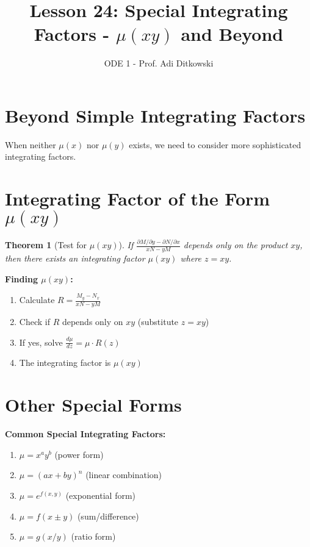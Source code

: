 \documentclass[12pt]{article}
\title{Lesson 24: Special Integrating Factors - $\mu(xy)$ and Beyond}
\author{ODE 1 - Prof. Adi Ditkowski}
\date{}
\newtheorem{theorem}{Theorem}
\begin{document}
\maketitle

\section{Beyond Simple Integrating Factors}

When neither $\mu(x)$ nor $\mu(y)$ exists, we need to consider more sophisticated integrating factors.

\section{Integrating Factor of the Form $\mu(xy)$}

\begin{theorem}[Test for $\mu(xy)$]
If $\frac{\partial M/\partial y - \partial N/\partial x}{xN - yM}$ depends only on the product $xy$, then there exists an integrating factor $\mu(xy)$ where $z = xy$.
\end{theorem}

\begin{algorithm}
\textbf{Finding $\mu(xy)$:}
\begin{enumerate}
    \item Calculate $R = \frac{M_y - N_x}{xN - yM}$
    \item Check if $R$ depends only on $xy$ (substitute $z = xy$)
    \item If yes, solve $\frac{d\mu}{dz} = \mu \cdot R(z)$
    \item The integrating factor is $\mu(xy)$
\end{enumerate}
\end{algorithm}

\section{Other Special Forms}

\begin{keypoint}
\textbf{Common Special Integrating Factors:}
\begin{enumerate}
    \item $\mu = x^a y^b$ (power form)
    \item $\mu = (ax + by)^n$ (linear combination)
    \item $\mu = e^{f(x,y)}$ (exponential form)
    \item $\mu = f(x \pm y)$ (sum/difference)
    \item $\mu = g(x/y)$ (ratio form)
\end{enumerate}
\end{keypoint}
\end{document}
